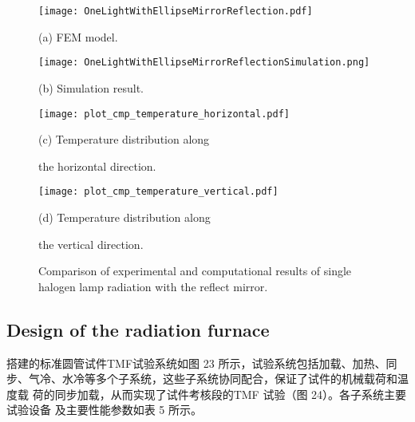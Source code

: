 \begin{figure}
  \begin{minipage}[t]{0.5\linewidth} %
  \nonumber
    \centering
    \texttt{[image: OneLightWithEllipseMirrorReflection.pdf]}
    \centerline{(a) FEM model.}
  \end{minipage}%
  \begin{minipage}[t]{0.5\linewidth}
    \centering
    \texttt{[image: OneLightWithEllipseMirrorReflectionSimulation.png]}
    \centerline{(b) Simulation result.}
  \end{minipage}

  \begin{minipage}[t]{0.5\linewidth} %
  \nonumber
    \centering
    \texttt{[image: plot\_cmp\_temperature\_horizontal.pdf]}
    \centerline{(c) Temperature distribution along }
    \centerline{the horizontal direction. }
  \end{minipage}%
  \begin{minipage}[t]{0.5\linewidth}
    \centering
    \texttt{[image: plot\_cmp\_temperature\_vertical.pdf]}
    \centerline{(d) Temperature distribution along }
    \centerline{the vertical direction. }
  \end{minipage}

  \caption{Comparison of experimental and computational results of single halogen lamp radiation with the reflect mirror.}
  \label{Fig:OneLightWithReflection}
\end{figure}
\newpage
\subsection{Design of the radiation furnace}
搭建的标准圆管试件TMF试验系统如图 23 所示，试验系统包括加载、加热、同步、气冷、水冷等多个子系统，这些子系统协同配合，保证了试件的机械载荷和温度载
荷的同步加载，从而实现了试件考核段的TMF 试验（图 24）。各子系统主要试验设备
及主要性能参数如表 5 所示。

